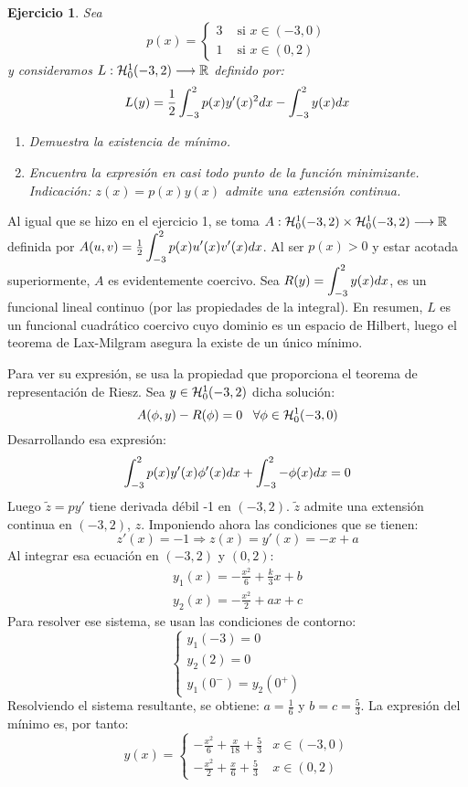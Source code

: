 \documentclass[12pt]{article}
\newtheorem{ejercicio}{Ejercicio}
\theoremstyle{definition}
\theoremstyle{remark}
\begin{document}
\begin{ejercicio}
Sea
\[
p(x)=\left\{
\begin{array}{lr}
3 & \text{ si } x\in(-3,0)\\
1 & \text{ si } x\in(0,2)
\end{array}
\right.
\]
y consideramos $\funcion{L}{\sobolevcero[-3,2]{1}}{\R}$ definido por:
\[
L(y)=\frac{1}{2}\integral{-3}{2}{p(x)y'(x)^2dx}-\integral{-3}{2}{y(x)dx}
\]
\begin{enumerate}
\item Demuestra la existencia de mínimo.
\item Encuentra la expresión en casi todo punto de la función minimizante. Indicación: $z(x)=p(x)y(x)$ admite una extensión continua. 
\end{enumerate}
\end{ejercicio}


Al igual que se hizo en el ejercicio 1, se toma $\funcion{A}{\sobolevcero[-3,2]{1}\times \sobolevcero[-3,2]{1}}{\R}$ definida por $A(u,v)=\frac{1}{2}\integral{-3}{2}{p(x)u'(x)v'(x)dx}$. Al ser $p(x)>0$ y estar acotada superiormente, $A$ es evidentemente coercivo. Sea $R(y)=\integral{-3}{2}{y(x)dx}$, es un funcional lineal continuo (por las propiedades de la integral). En resumen, $L$ es un funcional cuadrático coercivo cuyo dominio es un espacio de Hilbert, luego el teorema de Lax-Milgram asegura la existe de un único mínimo.

Para ver su expresión, se usa la propiedad que proporciona el teorema de representación de Riesz. Sea $y\in\sobolevcero[-3,2]{1}$ dicha solución:
\[
A(\phi,y)-R(\phi)=0 \espacio \forall \phi\in\sobolevcero[-3,0]{1}
\]
Desarrollando esa expresión:
\[
\integral{-3}{2}{p(x)y'(x)\phi'(x)dx}+\integral{-3}{2}{-\phi(x)dx}=0
\]
Luego $\widetilde{z}=py'$ tiene derivada débil -1 en $(-3,2)$. $\widetilde{z}$ admite una extensión continua en $(-3,2)$, $z$. Imponiendo ahora las condiciones que se tienen:
\[
z'(x)=-1\Rightarrow z(x)=y'(x)=-x+a
\]
Al integrar esa ecuación en $(-3,2)$ y $(0,2)$:
\[
\begin{array}{l}
y_1(x)=-\frac{x^2}{6}+\frac{k}{3}x+b\\
y_2(x)=-\frac{x^2}{2}+ax+c
\end{array}
\]
Para resolver ese sistema, se usan las condiciones de contorno:
\[
\left\{
\begin{array}{l}
y_1(-3)=0\\
y_2(2)=0\\
y_1(0^-)=y_2(0^+)
\end{array}
\right.
\]
Resolviendo el sistema resultante, se obtiene: $a=\frac{1}{6}$ y $b=c=\frac{5}{3}$. La expresión del mínimo es, por tanto:
\[
y(x)=\left\{
\begin{array}{ll}
-\frac{x^2}{6}+\frac{x}{18}+\frac{5}{3} & x\in(-3,0)\\
-\frac{x^2}{2}+\frac{x}{6}+\frac{5}{3} & x\in(0,2)
\end{array}
\right.
\]
\end{document}
